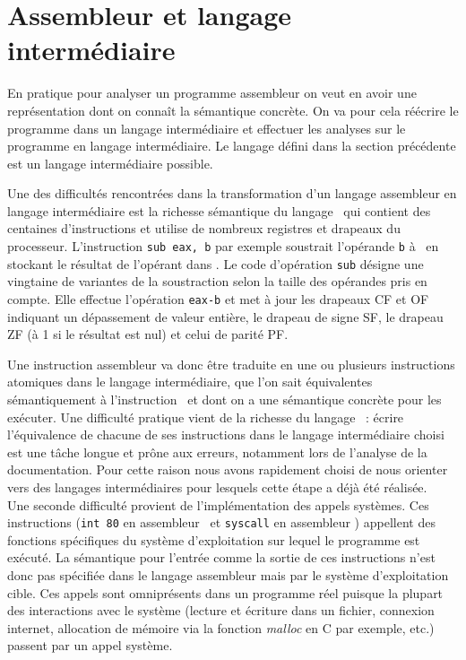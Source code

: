 \section{Assembleur et langage intermédiaire}
En pratique pour analyser un programme assembleur on veut en avoir une représentation dont on connaît la sémantique concrète.
On va pour cela réécrire le programme dans un langage intermédiaire et effectuer les analyses sur le programme en langage intermédiaire.
Le langage défini dans la section précédente est un langage intermédiaire possible.

Une des difficultés rencontrées dans la transformation d'un langage assembleur en langage intermédiaire est la richesse sémantique du langage \xq\ qui contient des centaines d'instructions et utilise de nombreux registres et drapeaux du processeur.
L'instruction \texttt{sub eax, b} par exemple soustrait l'opérande \texttt{b} à \eax\  en stockant le résultat de l'opérant dans \eax.
Le code d'opération \texttt{sub} désigne une vingtaine de variantes de la soustraction selon la taille des opérandes pris en compte. Elle effectue l'opération \texttt{eax-b} et met à jour les drapeaux CF et OF indiquant un dépassement de valeur entière, le drapeau de signe SF, le drapeau ZF (à 1 si le résultat est nul) et celui de parité PF.

Une instruction assembleur va donc être traduite en une ou plusieurs instructions atomiques dans le langage intermédiaire, que l'on sait équivalentes sémantiquement à l'instruction \xq\ et dont on a une sémantique concrète pour les exécuter.
Une difficulté pratique vient de la richesse du langage \xq\ : écrire l'équivalence de chacune de ses instructions dans le langage intermédiaire choisi est une tâche longue et prône aux erreurs, notamment lors de l'analyse de la documentation. 
Pour cette raison nous avons rapidement choisi de nous orienter vers des langages intermédiaires pour lesquels cette étape a déjà été réalisée.
\\

Une seconde difficulté provient de l'implémentation des appels systèmes. 
Ces instructions (\texttt{int 80} en assembleur \xq\ et \texttt{syscall} en assembleur \xs) appellent des fonctions spécifiques du système d'exploitation sur lequel le programme est exécuté.
La sémantique pour l'entrée comme la sortie de ces instructions n'est donc pas spécifiée dans le langage assembleur mais par le système d'exploitation cible.
Ces appels sont omniprésents dans un programme réel puisque la plupart des interactions avec le système (lecture et écriture dans un fichier, connexion internet, allocation de mémoire via la fonction \emph{malloc} en C par exemple, etc.) passent par un appel système.

